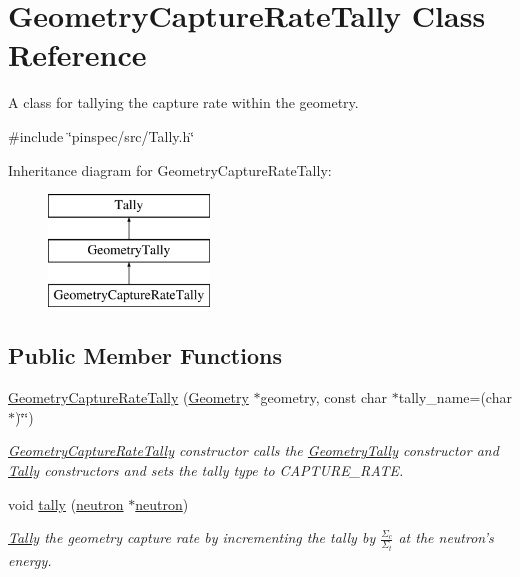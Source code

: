 \hypertarget{classGeometryCaptureRateTally}{\section{Geometry\-Capture\-Rate\-Tally Class Reference}
\label{classGeometryCaptureRateTally}
}


A class for tallying the capture rate within the geometry.  




{\ttfamily \#include \char`\"{}pinspec/src/\-Tally.\-h\char`\"{}}

Inheritance diagram for Geometry\-Capture\-Rate\-Tally\-:\begin{figure}[H]
\begin{center}
\leavevmode
\includegraphics[height=3.000000cm]{classGeometryCaptureRateTally}
\end{center}
\end{figure}
\subsection*{Public Member Functions}
\begin{DoxyCompactItemize}
\item 
\hyperlink{classGeometryCaptureRateTally_a72f1cd00b35302766fbe074c00d4403c}{Geometry\-Capture\-Rate\-Tally} (\hyperlink{classGeometry}{Geometry} $\ast$geometry, const char $\ast$tally\-\_\-name=(char $\ast$)\char`\"{}\char`\"{})
\begin{DoxyCompactList}\small\item\em \hyperlink{classGeometryCaptureRateTally}{Geometry\-Capture\-Rate\-Tally} constructor calls the \hyperlink{classGeometryTally}{Geometry\-Tally} constructor and \hyperlink{classTally}{Tally} constructors and sets the tally type to C\-A\-P\-T\-U\-R\-E\-\_\-\-R\-A\-T\-E. \end{DoxyCompactList}\item 
void \hyperlink{classGeometryCaptureRateTally_a18b5cb68008c52ab416ee7f5b73ac2a5}{tally} (\hyperlink{structneutron}{neutron} $\ast$\hyperlink{structneutron}{neutron})
\begin{DoxyCompactList}\small\item\em \hyperlink{classTally}{Tally} the geometry capture rate by incrementing the tally by $ \frac{\Sigma_c}{\Sigma_t} $ at the neutron's energy. \end{DoxyCompactList}\end{DoxyCompactItemize}
